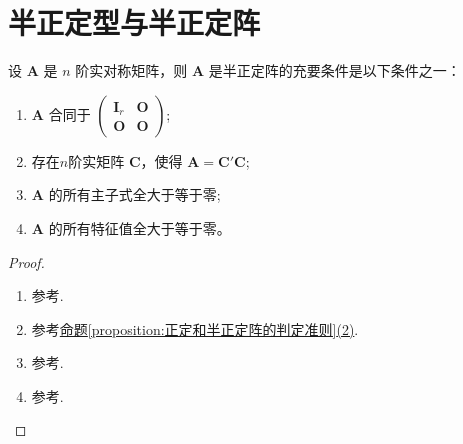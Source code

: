 \documentclass[../../main.tex]{subfiles}
\begin{document}
\section{半正定型与半正定阵}

\begin{proposition}\label{proposition:半正定阵的判定准则123}
设 \(\boldsymbol{A}\) 是 \(n\) 阶实对称矩阵，则 \(\boldsymbol{A}\) 是半正定阵的充要条件是以下条件之一：
\begin{enumerate}[(1)]
\item \(\boldsymbol{A}\) 合同于 \(\begin{pmatrix}\boldsymbol{I}_r&\boldsymbol{O}\\\boldsymbol{O}&\boldsymbol{O}\end{pmatrix}\);

\item 存在$n$阶实矩阵 \(\boldsymbol{C}\)，使得 \(\boldsymbol{A}=\boldsymbol{C}'\boldsymbol{C}\);

\item \(\boldsymbol{A}\) 的所有主子式全大于等于零;

\item \(\boldsymbol{A}\) 的所有特征值全大于等于零。
\end{enumerate}
\end{proposition}
\begin{proof}
\begin{enumerate}[(1)]
\item 参考.

\item 参考\hyperref[proposition:正定和半正定阵的判定准则]{命题\ref{proposition:正定和半正定阵的判定准则}(2)}.

\item 参考.

\item 参考.
\end{enumerate}
\end{proof}
\end{document}

